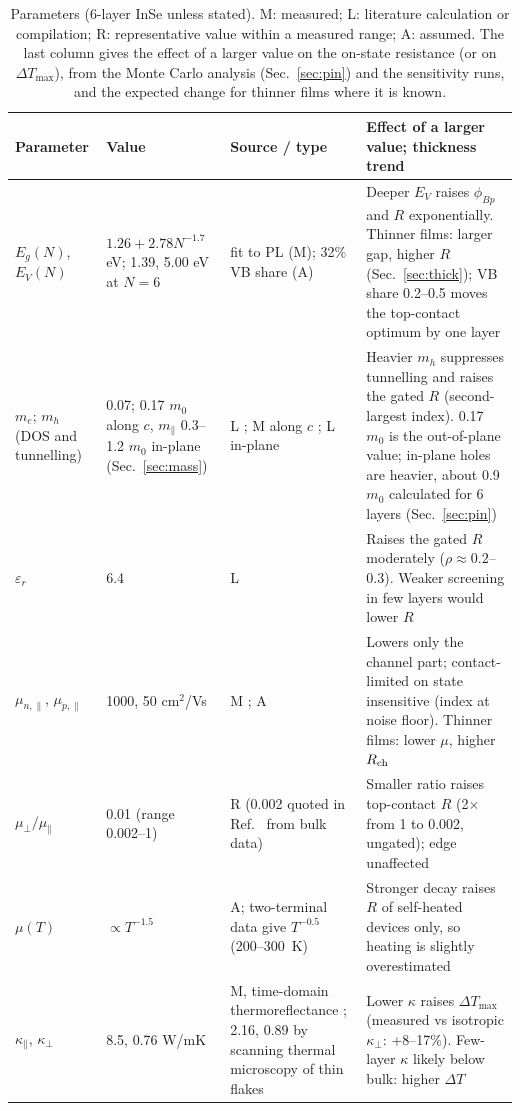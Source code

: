 \documentclass[11pt]{article}
\begin{document}
\begin{table}[!htbp]
\centering
\caption{Parameters (6-layer InSe unless stated). M: measured; L: literature calculation or compilation; R: representative value within a measured range; A: assumed. The last column gives the effect of a larger value on the on-state resistance (or on $\Delta T_{\max}$), from the Monte Carlo analysis (Sec.~\ref{sec:pin}) and the sensitivity runs, and the expected change for thinner films where it is known.}
\label{tab:params}\footnotesize
\setlength{\tabcolsep}{3pt}
\begin{tabular}{@{}p{}p{}p{}p{}@{}}
\toprule
Parameter & Value & Source / type & Effect of a larger value; thickness trend \\
\midrule
$E_g(N)$, $E_V(N)$ & $1.26+2.78N^{-1.7}$ eV; 1.39, 5.00 eV at $N=6$ & fit to PL \cite{refmudd,refmudd2013} (M); 32\% VB share (A) & Deeper $E_V$ raises $\phi_{Bp}$ and $R$ exponentially. Thinner films: larger gap, higher $R$ (Sec.~\ref{sec:thick}); VB share 0.2--0.5 moves the top-contact optimum by one layer \\
$m_e$; $m_h$ (DOS and tunnelling) & 0.07; 0.17 $m_0$ along $c$, $m_\parallel$ 0.3--1.2 $m_0$ in-plane (Sec.~\ref{sec:mass}) & L \cite{refmag}; M along $c$ \cite{refmudd2013}; L in-plane \cite{refpasquale} & Heavier $m_h$ suppresses tunnelling and raises the gated $R$ (second-largest index). 0.17 $m_0$ is the out-of-plane value; in-plane holes are heavier, about 0.9 $m_0$ calculated for 6 layers \cite{refpasquale} (Sec.~\ref{sec:pin}) \\
$\varepsilon_r$ & 6.4 & L & Raises the gated $R$ moderately ($\rho\approx0.2$--0.3). Weaker screening in few layers would lower $R$ \\
$\mu_{n,\parallel}$, $\mu_{p,\parallel}$ & 1000, 50 cm$^2$/Vs & M \cite{refband}; A & Lowers only the channel part; contact-limited on state insensitive (index at noise floor). Thinner films: lower $\mu$, higher $R_{\rm ch}$ \\
$\mu_\perp/\mu_\parallel$ & 0.01 (range 0.002--1) & R (0.002 quoted in Ref.~\cite{refsangwan} from bulk data) & Smaller ratio raises top-contact $R$ (2$\times$ from 1 to 0.002, ungated); edge unaffected \\
$\mu(T)$ & $\propto T^{-1.5}$ & A; two-terminal data give $T^{-0.5}$ (200--300~K) \cite{refchen} & Stronger decay raises $R$ of self-heated devices only, so heating is slightly overestimated \\
$\kappa_\parallel$, $\kappa_\perp$ & 8.5, 0.76 W/mK & M, time-domain thermoreflectance \cite{refrai}; 2.16, 0.89 by scanning thermal microscopy of thin flakes \cite{refgonzalez} & Lower $\kappa$ raises $\Delta T_{\max}$ (measured vs isotropic $\kappa_\perp$: +8--17\%). Few-layer $\kappa$ likely below bulk: higher $\Delta T$ \\

\end{tabular}
\end{table}
\end{document}
